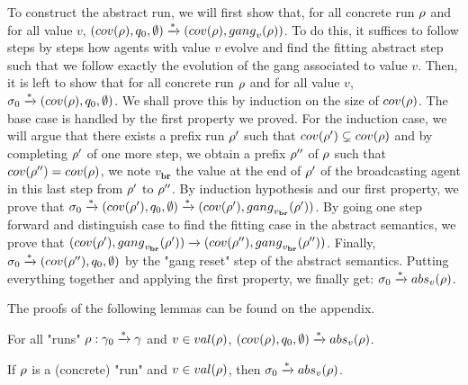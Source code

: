 To construct the abstract run, we will first show that, for all concrete run $\rho$ and for all value $v$, $(\statesin{\run}, q_0, \emptyset) \step{\ast}(\statesin{\run}, \gangof{v}{\run})$. To do this, it suffices to follow steps by steps how agents with value $v$ evolve and find the fitting abstract step such that we follow exactly the evolution of the gang associated to value $v$. 
Then, it is left to show that for all concrete run $\rho$ and for all value $v$, $\aconfiginit \step{\ast} (\statesin{\run}, q_0, \emptyset)$. We shall prove this by induction on the size of $\statesin{\run}$. The base case is handled by the first property we proved. For the induction case, we will argue that there exists a prefix run $\rho'$ such that $\statesin{\run'} \subsetneq \statesin{\run}$ and by completing $\rho'$ of one more step, we obtain a prefix $\rho''$ of $\rho$ such that $\statesin{\run''} = \statesin{\run}$, we note $v_{\mathbf{br}}$ the value at the end of $\rho'$ of the broadcasting agent in this last step from $\rho'$ to $\rho''$. By induction hypothesis and our first property, we prove that $\aconfiginit \step{\ast} (\statesin{\run'}, q_0, \emptyset) \step{\ast} (\statesin{\run'}, \gangof{v_{\mathbf{br}}}{\run'})$. By going one step forward and distinguish case to find the fitting case in the abstract semantics, we prove that $(\statesin{\run'}, \gangof{v_{\mathbf{br}}}{\run'}) \step{} (\statesin{\run''}, \gangof{v_{\mathbf{br}}}{\run''})$. Finally,  $\aconfiginit \step{\ast} (\statesin{\run''}, q_0, \emptyset)$ by the "gang reset" step of the abstract semantics. Putting everything together and applying the first property, we finally get: $\aconfiginit \step{\ast} \absproj{v}{\run}$.

The proofs of the following lemmas can be found on the appendix.

\begin{lemma}
	\label{lem:proof_completeness_covset_constant}
	For all "runs" $\rho: \gamma_0 \xrightarrow{*} \gamma$ and $\aval \in \valsof{\run}$, $(\statesin{\run}, q_0, \emptyset) \step{*} \absproj{\aval}{\run}$. 
\end{lemma}

\begin{lemma}
	\label{lem:abstraction_complete}
	If $\rho$ is a (concrete) "run" and $\aval \in \valsof{\run}$, then $\aconfiginit \step{*} \absproj{\aval}{\run}$. 
\end{lemma}

